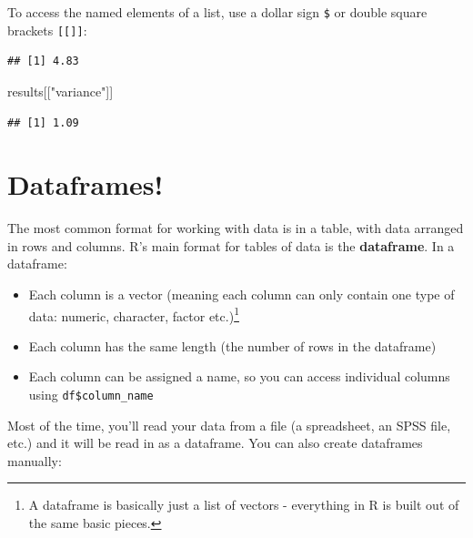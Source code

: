\documentclass[
]{book}
\newenvironment{Shaded}{\begin{snugshade}}{\end{snugshade}}
\newcommand{\AttributeTok}[1]{\textcolor[rgb]{0.77,0.63,0.00}{#1}}
\newcommand{\FloatTok}[1]{\textcolor[rgb]{0.00,0.00,0.81}{#1}}
\newcommand{\FunctionTok}[1]{\textcolor[rgb]{0.00,0.00,0.00}{#1}}
\newcommand{\NormalTok}[1]{#1}
\newcommand{\OtherTok}[1]{\textcolor[rgb]{0.56,0.35,0.01}{#1}}
\newcommand{\SpecialCharTok}[1]{\textcolor[rgb]{0.00,0.00,0.00}{#1}}
\newcommand{\StringTok}[1]{\textcolor[rgb]{0.31,0.60,0.02}{#1}}
\providecommand{\tightlist}{%
  \setlength{\itemsep}{0pt}\setlength{\parskip}{0pt}}
\begin{document}
To access the named elements of a list, use a dollar sign
\texttt{\$} or double square brackets \texttt{{[}{[}{]}{]}}:

\begin{Shaded}
\end{Shaded}

\begin{verbatim}
## [1] 4.83
\end{verbatim}

\begin{Shaded}
\begin{Highlighting}[]
\NormalTok{results[[}\StringTok{"variance"}\NormalTok{]]}
\end{Highlighting}
\end{Shaded}

\begin{verbatim}
## [1] 1.09
\end{verbatim}

\hypertarget{dataframes}{%
\section{Dataframes!}\label{dataframes}}

The most common format for working with data is in a table, with
data arranged in rows and columns. R's main format for tables
of data is the \textbf{dataframe}. In a dataframe:

\begin{itemize}
\tightlist
\item
  Each column is a vector (meaning each column can only contain one
  type of data: numeric, character, factor etc.)\footnote{A dataframe is basically just a list of
    vectors - everything in R is built out of the same basic pieces.}
\item
  Each column has the same length (the number of rows in the dataframe)
\item
  Each column can be assigned a name, so you can access individual
  columns using \texttt{df\$column\_name}
\end{itemize}

Most of the time, you'll read your data from a file (a spreadsheet, an
SPSS file, etc.) and it will be read in as a dataframe. You can also create
dataframes manually:
\end{document}
